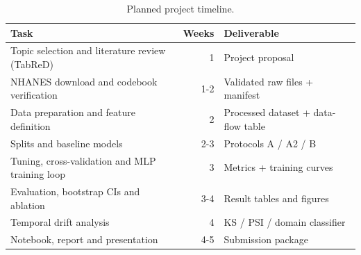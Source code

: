 \begin{table}[t]
\centering
\footnotesize
\caption{Planned project timeline.}
\label{tab:timeline}
\begin{tabular}{lrl}
\toprule
Task & Weeks & Deliverable \\
\midrule
Topic selection and literature review (TabReD) & 1 & Project proposal \\
NHANES download and codebook verification & 1-2 & Validated raw files + manifest \\
Data preparation and feature definition & 2 & Processed dataset + data-flow table \\
Splits and baseline models & 2-3 & Protocols A / A2 / B \\
Tuning, cross-validation and MLP training loop & 3 & Metrics + training curves \\
Evaluation, bootstrap CIs and ablation & 3-4 & Result tables and figures \\
Temporal drift analysis & 4 & KS / PSI / domain classifier \\
Notebook, report and presentation & 4-5 & Submission package \\
\bottomrule
\end{tabular}
\end{table}

